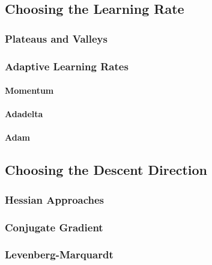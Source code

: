 		\subsection{Choosing the Learning Rate} %

			\subsubsection{Plateaus and Valleys} %

			\subsubsection{Adaptive Learning Rates} %

				\paragraph{Momentum} %

				\paragraph{Adadelta} %

				\paragraph{Adam} %

		\subsection{Choosing the Descent Direction} %

			\subsubsection{Hessian Approaches} %

			\subsubsection{Conjugate Gradient} %

			\subsubsection{Levenberg-Marquardt} %

